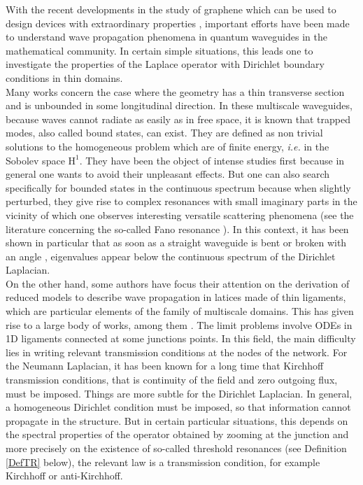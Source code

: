 \documentclass[11pt,a4paper]{article}
\newcommand{\mrm}[1]{\mathrm{#1}}
\newcommand{\mH}{\mrm{H}}
\begin{document}
With the recent developments in the study of graphene which can be used to design devices with extraordinary properties \cite{GeNo07,Geim09,NGPNG09}, important efforts have been made to understand wave propagation phenomena in quantum waveguides in the mathematical community. In certain simple situations, this leads one to investigate the properties of the Laplace operator with Dirichlet boundary conditions in thin domains. \\
\newline
Many works concern the case where the geometry has a thin transverse section and is unbounded in some longitudinal direction. In these multiscale waveguides, because waves cannot radiate as easily as in free space, it is known that trapped modes, also called bound states, can exist. They are defined as non trivial solutions to the homogeneous problem which are of finite energy, \textit{i.e.} in the Sobolev space $\mH^1$. They have been the object of intense studies first because in general one wants to avoid their unpleasant effects. But one can also search specifically for bounded states in the continuous spectrum \cite{SaBR06,Mois09,GPRO10} because when slightly perturbed, they give rise to complex resonances with small imaginary parts in the vicinity of which one observes interesting versatile scattering phenomena (see the literature concerning the so-called Fano resonance \cite{ShTu12,ChNa18}). In this context, it has been shown in particular that as soon as a straight waveguide is bent \cite{ExSe89,DuEx95} or broken with an angle \cite{ExL,ABGM91,CLMM93}, eigenvalues appear below the continuous spectrum of the Dirichlet Laplacian.\\ 
\newline
On the other hand, some authors have focus their attention on the derivation of reduced models to describe wave propagation in latices made of thin ligaments, which are particular elements of the family of multiscale domains. This has given rise to a large body of works, among them \cite{Kuch02,Post05,MoVa07,Grie08,Post12,BeKu13,Naza14,ExKo15,NaRU15,Pank17}. 
The limit problems involve ODEs in 1D ligaments connected at some junctions points. In this field, the main difficulty lies in writing relevant transmission conditions at the nodes of the network. For the Neumann Laplacian, it has been known for a long time that Kirchhoff transmission conditions, that is continuity of the field and zero outgoing flux, must be imposed. Things are more subtle for the Dirichlet Laplacian. In general, a homogeneous Dirichlet condition must be imposed, so that information cannot propagate in the structure. But in certain particular situations, this depends on the spectral properties of the operator obtained by zooming at the junction and more precisely on the existence of so-called threshold resonances (see Definition \ref{DefTR} below), the relevant law is a transmission condition, for example Kirchhoff or anti-Kirchhoff.\\
\end{document}
